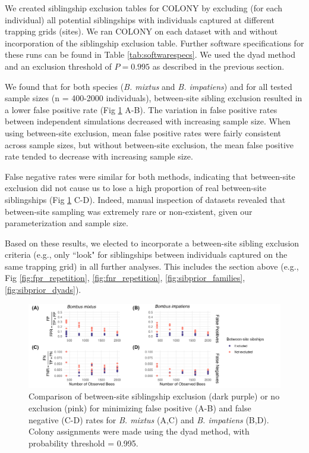 \documentclass[12pt]{article}
\begin{document}
We created siblingship exclusion tables for COLONY by excluding (for each individual) all potential siblingships with individuals captured at different trapping grids (sites). We ran COLONY on each dataset with and without incorporation of the siblingship exclusion table. Further software specifications for these runs can be found in Table \ref{tab:softwarespecs}. We used the dyad method and an exclusion threshold of $P = 0.995$ as described in the previous section.

We found that for both species (\emph{B. mixtus} and \emph{B. impatiens}) and for all tested sample sizes (n = 400-2000 individuals), between-site sibling exclusion resulted in a lower false positive rate (Fig \ref{fig:excl_size} A-B). The variation in false positive rates between independent simulations decreased with increasing sample size. When using between-site exclusion, mean false positive rates were fairly consistent across sample sizes, but without between-site exclusion, the mean false positive rate tended to decrease with increasing sample size.

False negative rates were similar for both methods, indicating that between-site exclusion did not cause us to lose a high proportion of real between-site siblingships (Fig \ref{fig:excl_size} C-D). Indeed, manual inspection of datasets revealed that between-site sampling was extremely rare or non-existent, given our parameterization and sample size.

Based on these results, we elected to incorporate a between-site sibling exclusion criteria (e.g., only ``look" for siblingships between individuals captured on the same trapping grid) in all further analyses. This includes the section above (e.g., Fig \ref{fig:fpr_repetition}, \ref{fig:fnr_repetition}, \ref{fig:sibprior_families}, \ref{fig:sibprior_dyads}).

\begin{figure}[H]
    \centering
    \includegraphics[width=\linewidth]{appendix_figures/excl_size.jpg}
    \caption{Comparison of between-site siblingship exclusion (dark purple) or no exclusion (pink) for minimizing false positive (A-B) and false negative (C-D) rates for \emph{B. mixtus} (A,C) and \emph{B. impatiens} (B,D). Colony assignments were made using the dyad method, with probability threshold = 0.995.}
    \label{fig:excl_size}
\end{figure}
\end{document}
